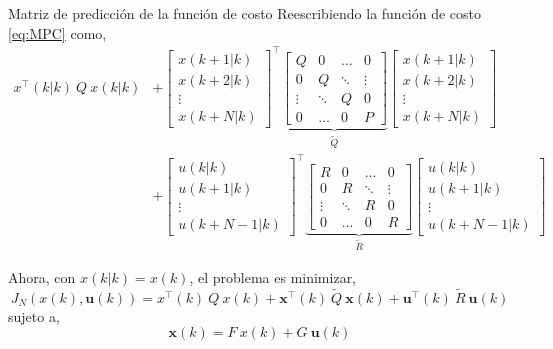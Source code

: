 \documentclass[8pt]{beamer}
\begin{document}
\begin{frame}[fragile]{Matriz de predicción de la función de costo}	
	Reescribiendo la función de costo \eqref{eq:MPC} como,
	\begin{equation}
	\begin{aligned}
	x^\intercal(k|k)~Q~x(k|k)
	&+
	\begin{bmatrix}
		x(k+1|k) \\
		x(k+2|k) \\
		\vdots   \\
		x(k+N|k)
	\end{bmatrix}^\intercal
	{\underbrace{
			\begin{bmatrix}
				Q      & 0      & \dots  & 0      \\
				0      & Q      & \ddots & \vdots \\
				\vdots & \ddots & Q      & 0      \\
				0      & \dots  & 0      & P
			\end{bmatrix}}_{\tilde{Q}}
	}
	\begin{bmatrix}
		x(k+1|k) \\
		x(k+2|k) \\
		\vdots   \\
		x(k+N|k)
	\end{bmatrix}
	\\
	&+
	\begin{bmatrix}
		u(k|k)     \\
		u(k+1|k)   \\
		\vdots     \\
		u(k+N-1|k)
	\end{bmatrix}^\intercal
	{\underbrace{
			\begin{bmatrix}
				R      & 0      & \dots  & 0      \\
				0      & R      & \ddots & \vdots \\
				\vdots & \ddots & R      & 0      \\
				0      & \dots  & 0      & R
			\end{bmatrix}}_{\tilde{R}}
	}
	\begin{bmatrix}
		u(k|k)     \\
		u(k+1|k)   \\
		\vdots     \\
		u(k+N-1|k)
	\end{bmatrix}
	\end{aligned}
	\end{equation}
	
	Ahora, con $x(k|k)=x(k)$, el problema es minimizar,
	\begin{equation}\label{eq:PredictionCost}
	J_N(x(k),\mathbf{u}(k)) =  x^\intercal(k)~Q~x(k) + \mathbf{x}^\intercal(k)~\tilde{Q}~\mathbf{x}(k) + \mathbf{u}^\intercal(k)~\tilde{R}~\mathbf{u}(k) 
	\end{equation}
	\qquad sujeto a,
	\begin{equation*}
	\mathbf{x}(k) = F~x(k)+G~\mathbf{u}(k)
	\end{equation*}
\end{frame}
\end{document}

